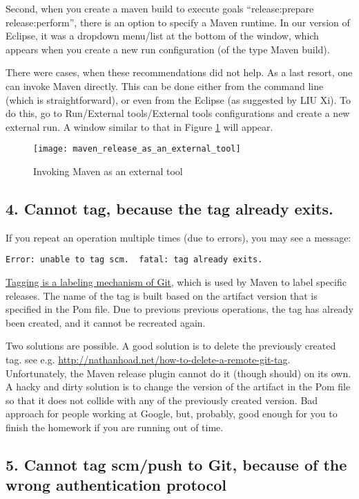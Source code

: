 Second, when you create a maven build to execute goals ``release:prepare release:perform'',
there is an option to specify a Maven runtime. In our version of Eclipse, it was 
a dropdown menu/list at the bottom of the window,
which appears when you create a new run configuration (of the type Maven build).

There were cases, when these recommendations did not help. As a last resort, one can invoke
Maven directly. This can be done either from the command line (which is straightforward),
or even from the Eclipse (as suggested by LIU Xi).
To do this, go to Run/External tools/External tools configurations and create a new external run.
A window similar to that in Figure \ref{MavenExtTool} will appear.



\begin{figure}
\centering
\texttt{[image: maven\_release\_as\_an\_external\_tool]}
\caption{Invoking Maven as an external tool\label{MavenExtTool}}
\end{figure}

\subsection{4. Cannot tag, because the tag already exits.}
If you repeat an operation multiple times (due to errors),
you may see a message:
\begin{verbatim}
Error: unable to tag scm.  fatal: tag already exits.
\end{verbatim}
\href{http://git-scm.com/docs/git-tag}{Tagging is a labeling mechanism of Git},
which is used by Maven to label specific releases.
The name of the tag is built based on the artifact version
that is specified in the Pom file.
Due to previous previous operations, the tag has already been created,
and it cannot be recreated again.

Two solutions are possible. A good solution is to delete the previously
created tag.
see e.g. \url{http://nathanhoad.net/how-to-delete-a-remote-git-tag}.
Unfortunately, the Maven release plugin cannot do it (though should) on its own.
A hacky and dirty solution is to change the version of the artifact 
in the Pom file so that it does not collide with any of the 
previously created version. 
Bad approach for people working at Google, but, probably, good
enough for you to finish the homework if you are running out of time.

\subsection{5. Cannot tag scm/push to Git, because of the wrong authentication protocol}

